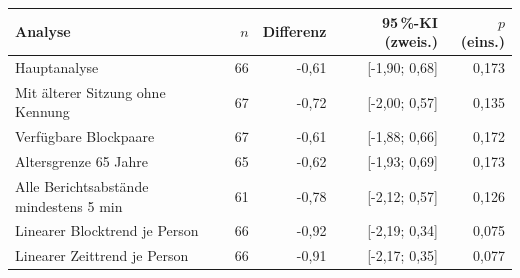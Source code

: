 \begin{tabular}{p{.38\linewidth}rrrr}
\toprule
Analyse & $n$ & Differenz & 95\,\%-KI (zweis.) & $p$ (eins.) \\
\midrule
Hauptanalyse & 66 & -0,61 & [-1,90; 0,68] & 0,173 \\
Mit älterer Sitzung ohne Kennung & 67 & -0,72 & [-2,00; 0,57] & 0,135 \\
Verfügbare Blockpaare & 67 & -0,61 & [-1,88; 0,66] & 0,172 \\
Altersgrenze 65 Jahre & 65 & -0,62 & [-1,93; 0,69] & 0,173 \\
Alle Berichtsabstände mindestens 5 min & 61 & -0,78 & [-2,12; 0,57] & 0,126 \\
Linearer Blocktrend je Person & 66 & -0,92 & [-2,19; 0,34] & 0,075 \\
Linearer Zeittrend je Person & 66 & -0,91 & [-2,17; 0,35] & 0,077 \\
\bottomrule
\end{tabular}

